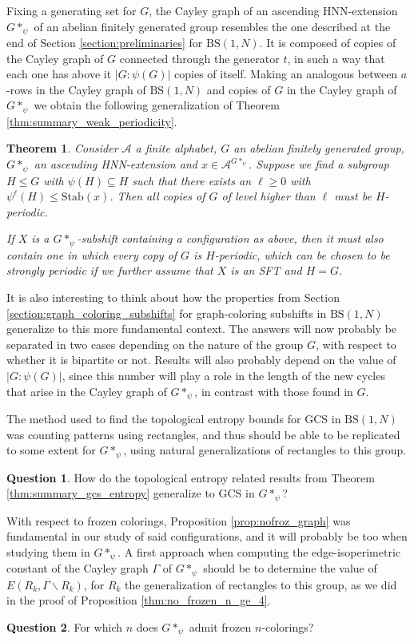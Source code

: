 \documentclass{aims}
\newcommand{\BS}[1][N]{\mathrm{BS}(1,#1)}
\newtheorem{theorem}{Theorem}[section]
\theoremstyle{definition}
\newtheorem*{question*}{Question}
\begin{document}
Fixing a generating set for $G$, the Cayley graph of an ascending HNN-extension $G*_{\psi}$ of an abelian finitely generated group resembles the one described at the end of Section \ref{section:preliminaries} for $\BS$. It is composed of copies of the Cayley graph of $G$ connected through the generator $t$, in such a way that each one has above it $|G:\psi(G)|$ copies of itself. Making an analogous between $a$-rows in the Cayley graph of $\BS$ and copies of $G$ in the Cayley graph of $G*_{\psi}$ we obtain the following generalization of Theorem \ref{thm:summary_weak_periodicity}.

\begin{theorem}
	Consider $\mathcal{A}$ a finite alphabet, $G$ an abelian finitely generated group, $G*_{\psi}$ an ascending HNN-extension and $x\in \mathcal{A}^{G*_{\psi}}$. Suppose we find a subgroup $H\le G$ with $\psi(H)\subseteq H$ such that there exists an $\ell\ge 0$ with $\psi^\ell(H)\le \mathrm{Stab}(x)$. Then all copies of $G$ of level higher than $\ell$ must be $H$-periodic.
	
	If $X$ is a $G*_{\psi}$-subshift containing a configuration as above, then it must also contain one in which every copy of $G$ is $H$-periodic, which can be chosen to be strongly periodic if we further assume that $X$ is an SFT and $H=G$. 
\end{theorem}


It is also interesting to think about how the properties from Section \ref{section:graph_coloring_subshifts} for graph-coloring subshifts in $\BS$ generalize to this more fundamental context. The answers will now probably be separated in two cases depending on the nature of the group $G$, with respect to whether it is bipartite or not. Results will also probably depend on the value of $|G:\psi(G)|$, since this number will play a role in the length of the new cycles that arise in the Cayley graph of $G*_{\psi}$, in contrast with those found in $G$.

The method used to find the topological entropy bounds for GCS in $\BS$ was counting patterns using rectangles, and thus should be able to be replicated to some extent for $G*_{\psi}$, using natural generalizations of rectangles to this group. 
\begin{question*}
	How do the topological entropy related results from Theorem \ref{thm:summary_gcs_entropy} generalize to GCS in $G*_{\psi}$?
\end{question*}
With respect to frozen colorings, Proposition \ref{prop:nofroz_graph} was fundamental in our study of said configurations, and it will probably be too when studying them in $G*_{\psi}$. A first approach when computing the edge-isoperimetric constant of the Cayley graph $\Gamma$ of $G*_{\psi}$ should be to determine the value of $E(R_k,\Gamma\backslash R_k)$, for $R_k$ the generalization of rectangles to this group, as we did in the proof of Proposition \ref{thm:no_frozen_n_ge_4}.
\begin{question*}
	For which $n$ does $G*_{\psi}$ admit frozen $n$-colorings?
\end{question*}
\end{document}
